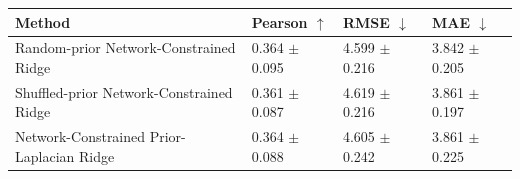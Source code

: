 \begin{tabular}{llll}
\toprule
Method & Pearson $\uparrow$ & RMSE $\downarrow$ & MAE $\downarrow$ \\
\midrule
Random-prior Network-Constrained Ridge & 0.364 $\pm$ 0.095 & 4.599 $\pm$ 0.216 & 3.842 $\pm$ 0.205 \\
Shuffled-prior Network-Constrained Ridge & 0.361 $\pm$ 0.087 & 4.619 $\pm$ 0.216 & 3.861 $\pm$ 0.197 \\
Network-Constrained Prior-Laplacian Ridge & 0.364 $\pm$ 0.088 & 4.605 $\pm$ 0.242 & 3.861 $\pm$ 0.225 \\
\bottomrule
\end{tabular}
